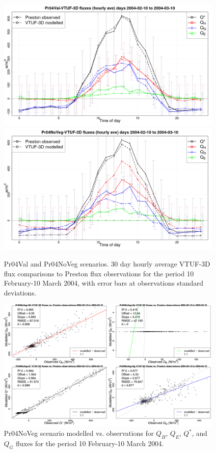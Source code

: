 \documentclass[final,3p,times,authoryear]{elsarticle}
\begin{document}
\begin{figure}[!htbp]
\includegraphics[trim = 0mm 0mm 0mm 0mm, clip, scale=0.16]{images/Pr04Val-EnergyBalanceOverallAve_.png}
\includegraphics[trim = 0mm 0mm 0mm 0mm, clip, scale=0.16]{images/Pr04NoVeg-EnergyBalanceOverallAve_.png}
\caption{Pr04Val and Pr04NoVeg scenarios. 30 day hourly average VTUF-3D flux comparisons to Preston flux observations for the period 10 February-10 March 2004, with error bars at observations standard deviations. \label{fig:Prestonnoveg30day}}    
\end{figure}

\begin{figure}[!htbp]
\includegraphics[trim = 0mm 0mm 0mm 0mm, clip, scale=0.30]{images/Pr04NoVeg-ErrorPlots.png}
\caption{Pr04NoVeg scenario modelled vs. observations for $Q_{H}$, $Q_{E}$, $Q^{*}$, and $Q_{G}$ fluxes for the period 10 February-10 March 2004. \label{fig:Prestonnovegerror}}    
\end{figure}
\end{document}

